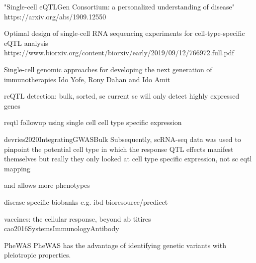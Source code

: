 \begin{outline}
        "Single-cell eQTLGen Consortium: a personalized understanding of disease"
        https://arxiv.org/abs/1909.12550

        Optimal design of single-cell RNA sequencing experiments for cell-type-specific eQTL analysis
        https://www.biorxiv.org/content/biorxiv/early/2019/09/12/766972.full.pdf

        Single-cell genomic approaches for developing the next generation of immunotherapies Ido Yofe, Rony Dahan and Ido Amit


        reQTL detection: bulk, sorted, sc
        current sc will only detect highly expressed genes

        reqtl followup using single cell cell type specific expression

        devries2020IntegratingGWASBulk
        Subsequently, scRNA-seq data was used to pinpoint the potential cell type in which the response QTL effects manifest themselves
            but really they only looked at cell type specific expression, not sc eqtl mapping

and allows
more phenotypes
        
        disease specific biobanks e.g. ibd bioresource/predicct

    vaccines:
        the cellular response, beyond ab titires cao2016SystemsImmunologyAntibody


    PheWAS\autocite{verma2017CurrentScopeChallenges}
    PheWAS has the advantage of identifying genetic variants with pleiotropic properties.


\end{outline}
